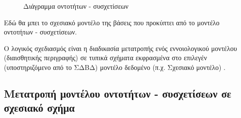 \documentclass{assignment}
\begin{document}
\begin{figure}
\begin{center}
\caption{Διάγραμμα οντοτήτων - συσχετίσεων}
\label{fig:ER:diagram}
\end{center}
\end{figure}


Εδώ θα μπει το σχεσιακό μοντέλο της βάσεις που προκύπτει από το μοντέλο οντοτήτων - συσχετίσεων.

Ο λογικός σχεδιασμός είναι η διαδικασία μετατροπής ενός εννοιολογικού μοντέλου (διαισθητικής περιγραφής) σε τυπικά σχήματα εκφρασμένα στο επιλεγέν (υποστηριζόμενο από το ΣΔΒΔ) μοντέλο δεδομένο (π.χ. Σχεσιακό μοντέλο) \cite{class_notes}.

\subsection{Μετατροπή μοντέλου οντοτήτων - συσχετίσεων σε σχεσιακό σχήμα}
\end{document}
